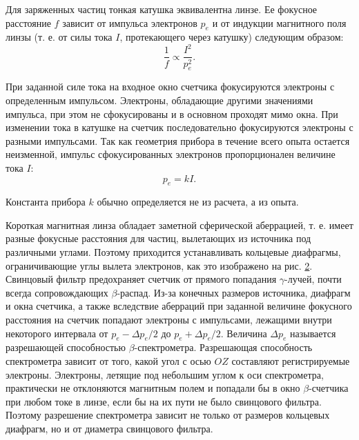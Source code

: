 \documentclass[a4paper,12pt]{article}
\begin{document}
Для заряженных частиц тонкая катушка эквивалентна линзе. Ее фокусное расстояние $f$ зависит от импульса электронов $p_e$ и от индукции магнитного поля линзы (т. е. от силы тока $I$, протекающего через катушку) следующим образом:
\begin{equation}\label{eq: f via I}
    \frac{1}{f} \propto \frac{I^2}{p_e^2}.
\end{equation}

При заданной силе тока на входное окно счетчика фокусируются электроны с определенным импульсом. Электроны, обладающие другими значениями импульса, при этом не сфокусированы и в основном проходят мимо окна. При изменении тока в катушке на счетчик последовательно фокусируются электроны с разными импульсами. Так как геометрия прибора в течение всего опыта остается неизменной, импульс сфокусированных электронов пропорционален величине тока $I$:
\begin{equation}\label{eq: p_e via I}
    p_e = kI.
\end{equation}

Константа прибора $k$ обычно определяется не из расчета, а из опыта.

Короткая магнитная линза обладает заметной сферической аберрацией, т. е. имеет разные фокусные расстояния для частиц, вылетающих из источника под различными углами. Поэтому приходится устанавливать кольцевые диафрагмы, ограничивающие углы вылета электронов, как это изображено на рис. \hyperref[fig: Beta decay scheme]{2}. Свинцовый фильтр предохраняет счетчик от прямого попадания $\gamma$-лучей, почти всегда сопровождающих $\beta$-распад. Из-за конечных размеров источника, диафрагм и окна счетчика, а также вследствие аберраций при заданной величине фокусного расстояния на счетчик попадают электроны с импульсами, лежащими внутри некоторого интервала от $p_e - \Delta p_e /2$ до $p_e + \Delta p_e /2$. Величина $\Delta p_e$ называется разрешающей способностью $\beta$-спектрометра. Разрешающая способность спектрометра зависит от того, какой угол с осью $OZ$ составляют регистрируемые электроны. Электроны, летящие под небольшим углом к оси спектрометра, практически не отклоняются магнитным полем и попадали бы в окно $\beta$-счетчика при любом токе в линзе, если бы на их пути не было свинцового фильтра. Поэтому разрешение спектрометра зависит не только от размеров кольцевых диафрагм, но и от диаметра свинцового фильтра.
\end{document}
